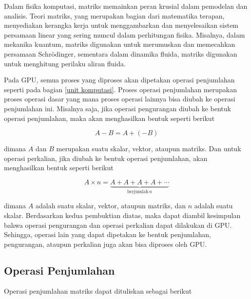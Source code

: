Dalam fisika komputasi, matriks memainkan peran krusial dalam pemodelan dan
analisis. Teori matriks, yang merupakan bagian dari matematika terapan,
menyediakan kerangka kerja untuk menggambarkan dan menyelesaikan sistem
persamaan linear yang sering muncul dalam perhitungan fisika. Misalnya, dalam
mekanika kuantum, matriks digunakan untuk merumuskan dan memecahkan persamaan
Schrödinger, sementara dalam dinamika fluida, matriks digunakan untuk
menghitung perilaku aliran fluida.

Pada GPU, semua proses yang diproses akan dipetakan operasi penjumlahan seperti
pada bagian \ref{unit komputasi}. Proses operasi penjumlahan merupakan proses
operasi dasar yang mana proses operasi lainnya bisa diubah ke operasi
penjumlahan ini. Misalnya saja, jika operasi pengurangan diubah ke bentuk
operasi penjumlahan, maka akan menghasilkan bentuk seperti berikut

\[
	A - B = A + (-B)
\]

\noindent
dimana $A$ dan $B$ merupakan suatu skalar, vektor, ataupun matriks. Dan untuk operasi
perkalian, jika diubah ke bentuk operasi penjumlahan, akan menghasilkan bentuk seperti
berikut

\[
	A \times n = \underbrace{A + A + A + A + \cdots}_{\text{berjumlah}\, n}
\]

\noindent
dimana $A$ adalah suatu skalar, vektor, ataupun matriks, dan $n$ adalah suatu
skalar. Berdasarkan kedua pembuktian diatas, maka dapat diambil kesimpulan bahwa
operasi pengurangan dan operasi perkalian dapat dilakukan di GPU. Sehingga,
operasi lain yang dapat dipetakan ke bentuk penjumlahan, pengurangan, ataupun
perkalian juga akan bisa diproses oleh GPU.

\subsection{Operasi Penjumlahan}

Operasi penjumlahan matriks dapat dituliskan sebagai berikut

